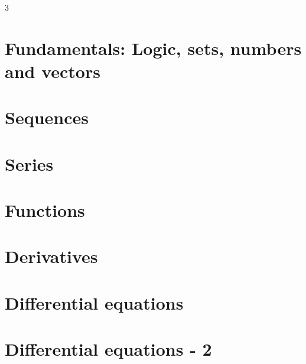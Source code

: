 \documentclass[8pt, a4paper]{extarticle}
\author{Timofey Shatnyy}
\begin{document}
\begin{multicols}{3}
    {\fontsize{7}{7}\selectfont
    \section{Fundamentals: Logic, sets, numbers and vectors}
    
    
    
    \section{Sequences}
    
    \section{Series}
    
    \section{Functions}
    
    \section{Derivatives}
    
    \section{Differential equations}
    
    
    \section{Differential equations - 2}
    

    }
\end{multicols}
\newpage

\newpage


\end{document}

